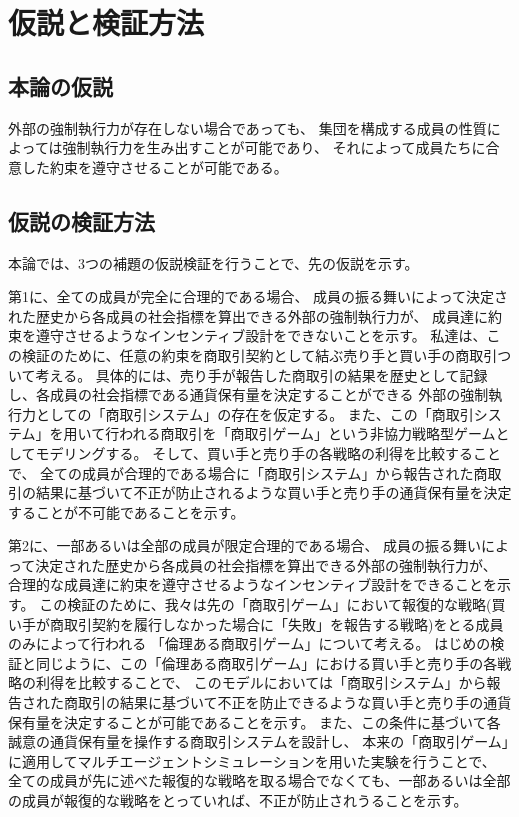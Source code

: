 \chapter{仮説と検証方法}
\section{本論の仮説}
外部の強制執行力が存在しない場合であっても、
集団を構成する成員の性質によっては強制執行力を生み出すことが可能であり、
それによって成員たちに合意した約束を遵守させることが可能である。


\section{仮説の検証方法}
本論では、3つの補題の仮説検証を行うことで、先の仮説を示す。

第1に、全ての成員が完全に合理的である場合、
成員の振る舞いによって決定された歴史から各成員の社会指標を算出できる外部の強制執行力が、
成員達に約束を遵守させるようなインセンティブ設計をできないことを示す。
私達は、この検証のために、任意の約束を商取引契約として結ぶ売り手と買い手の商取引ついて考える。
具体的には、売り手が報告した商取引の結果を歴史として記録し、各成員の社会指標である通貨保有量を決定することができる
外部の強制執行力としての「商取引システム」の存在を仮定する。
また、この「商取引システム」を用いて行われる商取引を「商取引ゲーム」という非協力戦略型ゲームとしてモデリングする。
そして、買い手と売り手の各戦略の利得を比較することで、
全ての成員が合理的である場合に「商取引システム」から報告された商取引の結果に基づいて不正が防止されるような買い手と売り手の通貨保有量を決定することが不可能であることを示す。

第2に、一部あるいは全部の成員が限定合理的である場合、
成員の振る舞いによって決定された歴史から各成員の社会指標を算出できる外部の強制執行力が、
合理的な成員達に約束を遵守させるようなインセンティブ設計をできることを示す。
この検証のために、我々は先の「商取引ゲーム」において報復的な戦略(買い手が商取引契約を履行しなかった場合に「失敗」を報告する戦略)をとる成員のみによって行われる
「倫理ある商取引ゲーム」について考える。
はじめの検証と同じように、この「倫理ある商取引ゲーム」における買い手と売り手の各戦略の利得を比較することで、
このモデルにおいては「商取引システム」から報告された商取引の結果に基づいて不正を防止できるような買い手と売り手の通貨保有量を決定することが可能であることを示す。
また、この条件に基づいて各誠意の通貨保有量を操作する商取引システムを設計し、
本来の「商取引ゲーム」に適用してマルチエージェントシミュレーションを用いた実験を行うことで、
全ての成員が先に述べた報復的な戦略を取る場合でなくても、一部あるいは全部の成員が報復的な戦略をとっていれば、不正が防止されうることを示す。


